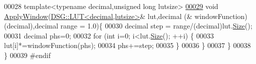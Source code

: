 \begin{DoxyCode}
00028 \textcolor{comment}{}        \textcolor{keyword}{template}<\textcolor{keyword}{typename} decimal,\textcolor{keywordtype}{unsigned} \textcolor{keywordtype}{long} lutsize>
\hypertarget{_window_8h_source_l00029}{}\hyperlink{namespace_d_s_g_1_1_window_a5e559a3fa00e81c4210043fea59d8dae}{00029}         \textcolor{keywordtype}{void} \hyperlink{namespace_d_s_g_1_1_window_ab3ab521b2e0d85dc752ccc42e642b203}{ApplyWindow}(\hyperlink{class_d_s_g_1_1_l_u_t}{DSG::LUT<decimal,lutsize>}& lut,decimal (&
      windowFunction)(decimal),decimal range = 1.0)\{
00030             decimal step = range/(decimal)lut.\hyperlink{class_d_s_g_1_1_l_u_t_a2d1a2112f9e960c7b70882a19d670ff9}{Size}();
00031             decimal phs=0;
00032             \textcolor{keywordflow}{for} (\textcolor{keywordtype}{int} i=0; i<lut.\hyperlink{class_d_s_g_1_1_l_u_t_a2d1a2112f9e960c7b70882a19d670ff9}{Size}(); ++i) \{
00033                 lut[i]*=windowFunction(phs);
00034                 phs+=step;
00035             \}
00036         \}
00037     \}
00038 \}
00039 \textcolor{preprocessor}{#endif}
\end{DoxyCode}
